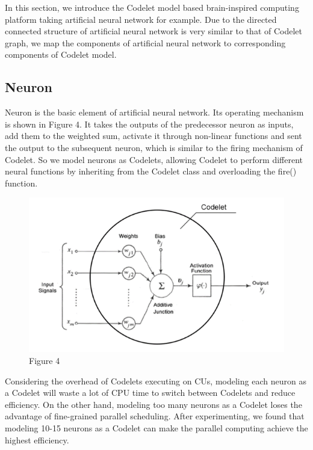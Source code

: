 In this section, we introduce the Codelet model based brain-inspired computing platform taking artificial neural network for example. Due to the directed connected structure of artificial neural network is very similar to that of Codelet graph, we map the components of artificial neural network to corresponding components of Codelet model.
\subsection{Neuron}
Neuron is the basic element of artificial neural network. Its operating mechanism is shown in Figure 4. It takes the outputs of the predecessor neuron as inputs, add them to the weighted sum, activate it through non-linear functions and sent the output to the subsequent neuron, which is similar to the firing mechanism of Codelet. So we model neurons as Codelets, allowing Codelet to perform different neural functions by inheriting from the Codelet class and overloading the fire() function. 
 
\begin{figure}[h]
\caption{Figure 4}
\centering
\includegraphics[width=1\textwidth]{Fig/figure4.png}
\end{figure}

Considering the overhead of Codelets executing on CUs, modeling each neuron as a Codelet will waste a lot of CPU time to switch between Codelets and reduce efficiency. On the other hand, modeling too many neurons as a Codelet loses the advantage of fine-grained parallel scheduling. After experimenting, we found that modeling 10-15 neurons as a Codelet can make the parallel computing achieve the highest efficiency.

